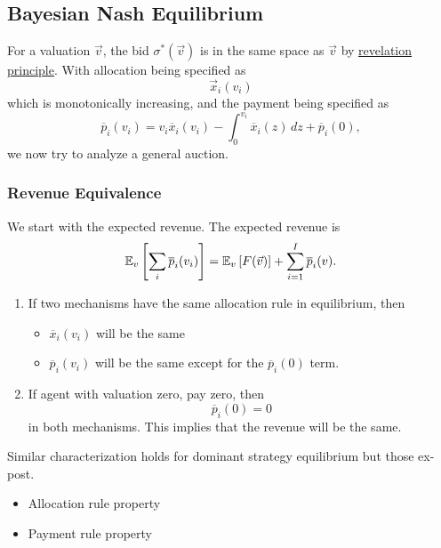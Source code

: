 \subsection{Bayesian Nash Equilibrium}
\begin{prev}
	For a valuation \(\vec{v}\), the bid \(\sigma^{*}(\vec{v})\) is in the same space as \(\vec{v}\) by \hyperref[Revelation-Principle]{revelation principle}.
	With allocation being specified as
	\[
		\vec{x}_{i}(v_{i})
	\]
	which is monotonically increasing, and the payment being specified as
	\[
		\overline{p}_{i}(v_{i}) = v_{i}\overline{x}_{i}(v_{i}) - \int_0^{v_{i}}\overline{x}_{i}(z)\,dz + \overline{p}_{i}(0),
	\]
	we now try to analyze a general auction.
\end{prev}

\subsubsection{Revenue Equivalence}
We start with the expected revenue. The expected revenue is
\[
	\mathbb{\MakeUppercase{E}}_v\left[\sum\limits_{i}\overline{p}_{i}(v_{i}) \right] = \mathbb{\MakeUppercase{E}}_v\left[F(\vec{v}) \right] + \sum\limits_{i=1}^{I} \overline{p}_{i}(v).
\]
\begin{enumerate}
	\item If two mechanisms have the same allocation rule in equilibrium, then
	      \begin{itemize}
		      \item \(\overline{x}_{i}(v_{i})\) will be the same
		      \item \(\overline{p}_{i}(v_{i})\) will be the same except for the \(\overline{p}_{i}(0)\) term.
	      \end{itemize}
	\item If agent with valuation zero, pay zero, then
	      \[
		      \overline{p}_{i}(0) = 0
	      \]
	      in both mechanisms. This implies that the revenue will be the same.
\end{enumerate}

\begin{note}
	Similar characterization holds for dominant strategy equilibrium but those ex-post.
	\begin{itemize}
		\item Allocation rule property
		\item Payment rule property
	\end{itemize}
\end{note}

